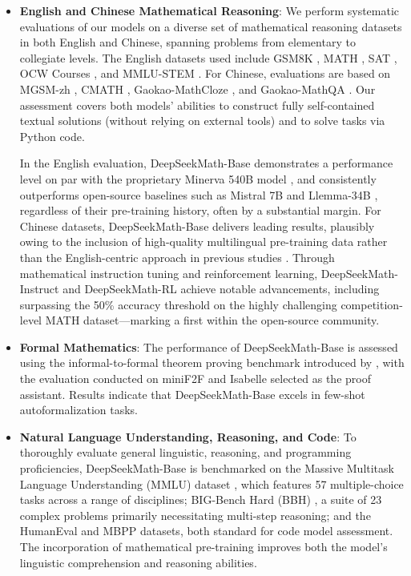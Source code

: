 \begin{itemize}[topsep=0pt]
    \item \textbf{English and Chinese Mathematical Reasoning}: We perform systematic evaluations of our models on a diverse set of mathematical reasoning datasets in both English and Chinese, spanning problems from elementary to collegiate levels. The English datasets used include GSM8K \citep{gsm8k}, MATH \citep{MATH}, SAT \citep{llemma}, OCW Courses \citep{minerva}, and MMLU-STEM \citep{mmlu}. For Chinese, evaluations are based on MGSM-zh \citep{mgsm}, CMATH \citep{wei2023cmath}, Gaokao-MathCloze \citep{agieval}, and Gaokao-MathQA \citep{agieval}. Our assessment covers both models' abilities to construct fully self-contained textual solutions (without relying on external tools) and to solve tasks via Python code.

    In the English evaluation, DeepSeekMath-Base demonstrates a performance level on par with the proprietary Minerva 540B model \citep{minerva}, and consistently outperforms open-source baselines such as Mistral 7B \citep{mistral} and Llemma-34B \citep{llemma}, regardless of their pre-training history, often by a substantial margin. For Chinese datasets, DeepSeekMath-Base delivers leading results, plausibly owing to the inclusion of high-quality multilingual pre-training data rather than the English-centric approach in previous studies \citep{minerva,llemma}. Through mathematical instruction tuning and reinforcement learning, DeepSeekMath-Instruct and DeepSeekMath-RL achieve notable advancements, including surpassing the 50\% accuracy threshold on the highly challenging competition-level MATH dataset—marking a first within the open-source community.

\item \textbf{Formal Mathematics}: The performance of DeepSeekMath-Base is assessed using the informal-to-formal theorem proving benchmark introduced by \citep{dsp_proof}, with the evaluation conducted on miniF2F \citep{minif2f} and Isabelle \citep{isabelle} selected as the proof assistant. Results indicate that DeepSeekMath-Base excels in few-shot autoformalization tasks.

\item \textbf{Natural Language Understanding, Reasoning, and Code}: To thoroughly evaluate general linguistic, reasoning, and programming proficiencies, DeepSeekMath-Base is benchmarked on the Massive Multitask Language Understanding (MMLU) dataset \citep{mmlu}, which features 57 multiple-choice tasks across a range of disciplines; BIG-Bench Hard (BBH) \citep{bbh}, a suite of 23 complex problems primarily necessitating multi-step reasoning; and the HumanEval \citep{codex} and MBPP \citep{mbpp} datasets, both standard for code model assessment. The incorporation of mathematical pre-training improves both the model’s linguistic comprehension and reasoning abilities.
\end{itemize}

